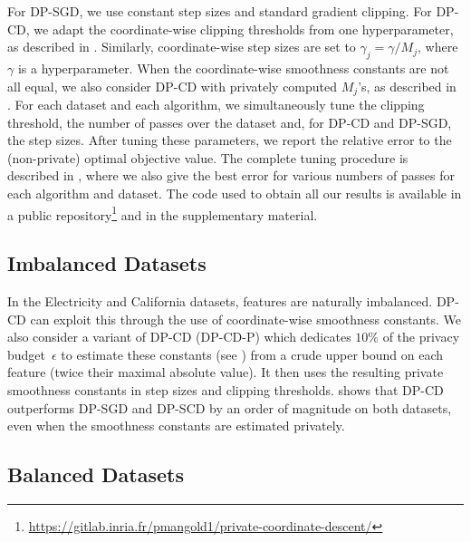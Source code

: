 For DP-SGD, we use constant step sizes and standard gradient
clipping. For DP-CD, we adapt the coordinate-wise clipping thresholds
from one hyperparameter, as described in
. Similarly, coordinate-wise step sizes are set to
$\gamma_j = \gamma / M_j$, where $\gamma$ is a hyperparameter. When
the coordinate-wise smoothness constants are not all equal, we also
consider DP-CD with privately computed $M_j$'s, as described in
.  For each dataset and each algorithm, we
simultaneously tune the clipping threshold, the number of passes over
the dataset and, for DP-CD and DP-SGD, the step sizes.  After tuning
these parameters, we report the relative error to the (non-private)
optimal objective value.  The complete tuning procedure is described
in , where we also give the best error for
various numbers of passes for each algorithm and dataset.  The code
used to obtain all our results is available in a public repository\footnote{
\url{https://gitlab.inria.fr/pmangold1/private-coordinate-descent/}}
and in the supplementary material.

\subsection{Imbalanced Datasets}
\label{sec:raw-datasets}


In the Electricity and California datasets, features are naturally
imbalanced. DP-CD can exploit this through the use of coordinate-wise
smoothness constants. We also consider a variant of DP-CD (DP-CD-P)
which dedicates $10\%$ of the privacy budget~$\epsilon$ to estimate
these constants (see ) from a crude upper bound
on each feature (twice their maximal absolute value). It then uses the
resulting private smoothness constants in step sizes and clipping
thresholds.  shows that DP-CD outperforms DP-SGD
and DP-SCD by an order of magnitude on both datasets, even when the
smoothness constants are estimated privately.



\subsection{Balanced Datasets}
\label{sec:stand-datas}

